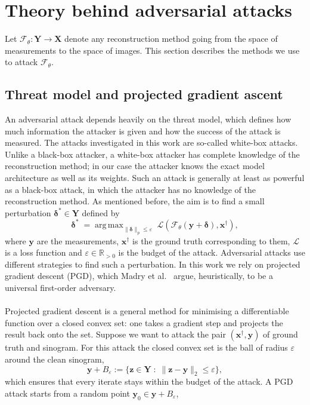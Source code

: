 \documentclass{article}
\DeclareMathOperator*{\argmax}{arg\,max}
\numberwithin{equation}{section}
\begin{document}
\section{Theory behind adversarial attacks}
Let $\mathcal{F}_\theta:\mathbf{Y}\to\mathbf{X}$ denote any reconstruction method going from the space of measurements to
the space of images. This section describes the methods we use to attack $\mathcal{F}_\theta$.
\subsection{Threat model and projected gradient ascent}\label{sec:attacks}
An adversarial attack depends heavily on the threat model, which defines how much information the attacker is given and how the success of the attack is measured.
The attacks investigated in this work are so-called white-box attacks. Unlike a black-box attacker, a white-box attacker has complete knowledge of the reconstruction method;
in our case the attacker knows the exact model architecture as well as its weights. Such an attack is generally at least as powerful as a black-box attack,
in which the attacker has no knowledge of the reconstruction method. As mentioned before, the aim is to find a small perturbation $\boldsymbol{\delta}^* \in\mathbf{Y}$ defined by
\[\boldsymbol{\delta}^*\;=\argmax_{\lVert\boldsymbol{\delta}\rVert_p \leq \varepsilon}\;\mathcal{L}(\mathcal{F}_\theta(\mathbf{y}+\boldsymbol{\delta}), \mathbf{x}^\dagger ),\]
where $\mathbf{y}$ are the measurements, $\mathbf{x}^\dagger$ is the ground truth corresponding to them,
$\mathcal{L}$ is a loss function and $\varepsilon\in\mathbb{R}_{>0}$ is the budget of the attack.
Adversarial attacks use different strategies to find such a perturbation. In this work we rely on projected gradient descent (PGD), which
Madry et al.\ \parencite{PGD} argue, heuristically, to be a universal first-order adversary.\\\\
Projected gradient descent is a general method for minimising a differentiable function over
a closed convex set: one takes a gradient step and projects the result back onto the set.
Suppose we want to attack the pair $(\mathbf{x}^\dagger, \mathbf{y})$ of ground truth and sinogram. For this attack the closed convex set is the ball of radius $\varepsilon$ around the clean sinogram,
\[\mathbf{y}+B_\varepsilon:=\{\mathbf{z}\in\mathbf{Y}\;:\;\lVert\mathbf{z}-\mathbf{y}\rVert_2\leq\varepsilon\},\]
which ensures that every iterate stays within the budget of the attack.
A PGD attack starts from a random point $\mathbf{y}_0\in\mathbf{y}+B_\varepsilon$,
\end{document}
